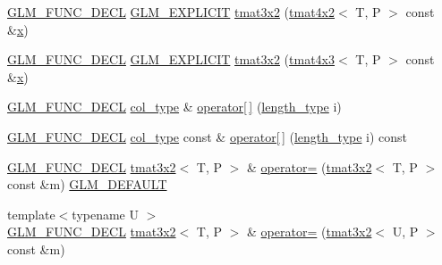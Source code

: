\begin{DoxyCompactItemize}
\item 
\mbox{\hyperlink{setup_8hpp_ab2d052de21a70539923e9bcbf6e83a51}{G\+L\+M\+\_\+\+F\+U\+N\+C\+\_\+\+D\+E\+CL}} \mbox{\hyperlink{setup_8hpp_a6c74f5a5e7b134ab69023ff9a30d4d5d}{G\+L\+M\+\_\+\+E\+X\+P\+L\+I\+C\+IT}} \mbox{\hyperlink{structglm_1_1tmat3x2_aa157cfdb7cf64c70765e4421dac9e4c1}{tmat3x2}} (\mbox{\hyperlink{structglm_1_1tmat4x2}{tmat4x2}}$<$ T, P $>$ const \&\mbox{\hyperlink{glad_8h_a92d0386e5c19fb81ea88c9f99644ab1d}{x}})
\item 
\mbox{\hyperlink{setup_8hpp_ab2d052de21a70539923e9bcbf6e83a51}{G\+L\+M\+\_\+\+F\+U\+N\+C\+\_\+\+D\+E\+CL}} \mbox{\hyperlink{setup_8hpp_a6c74f5a5e7b134ab69023ff9a30d4d5d}{G\+L\+M\+\_\+\+E\+X\+P\+L\+I\+C\+IT}} \mbox{\hyperlink{structglm_1_1tmat3x2_ac101d14687670dd6916a9e5c161efdf1}{tmat3x2}} (\mbox{\hyperlink{structglm_1_1tmat4x3}{tmat4x3}}$<$ T, P $>$ const \&\mbox{\hyperlink{glad_8h_a92d0386e5c19fb81ea88c9f99644ab1d}{x}})
\item 
\mbox{\hyperlink{setup_8hpp_ab2d052de21a70539923e9bcbf6e83a51}{G\+L\+M\+\_\+\+F\+U\+N\+C\+\_\+\+D\+E\+CL}} \mbox{\hyperlink{structglm_1_1tmat3x2_a341f5be67463bce97692bc232312b7e8}{col\+\_\+type}} \& \mbox{\hyperlink{structglm_1_1tmat3x2_a7bf6dec8837ea7b18163629c1fdf60bb}{operator\mbox{[}$\,$\mbox{]}}} (\mbox{\hyperlink{structglm_1_1tmat3x2_a358b949a615ed48c4dc18c53a55358df}{length\+\_\+type}} i)
\item 
\mbox{\hyperlink{setup_8hpp_ab2d052de21a70539923e9bcbf6e83a51}{G\+L\+M\+\_\+\+F\+U\+N\+C\+\_\+\+D\+E\+CL}} \mbox{\hyperlink{structglm_1_1tmat3x2_a341f5be67463bce97692bc232312b7e8}{col\+\_\+type}} const  \& \mbox{\hyperlink{structglm_1_1tmat3x2_a870e0f36a2588eb7e739aa52a2302279}{operator\mbox{[}$\,$\mbox{]}}} (\mbox{\hyperlink{structglm_1_1tmat3x2_a358b949a615ed48c4dc18c53a55358df}{length\+\_\+type}} i) const
\item 
\mbox{\hyperlink{setup_8hpp_ab2d052de21a70539923e9bcbf6e83a51}{G\+L\+M\+\_\+\+F\+U\+N\+C\+\_\+\+D\+E\+CL}} \mbox{\hyperlink{structglm_1_1tmat3x2}{tmat3x2}}$<$ T, P $>$ \& \mbox{\hyperlink{structglm_1_1tmat3x2_ad3e07207fa54ffc24aad6151ab116af8}{operator=}} (\mbox{\hyperlink{structglm_1_1tmat3x2}{tmat3x2}}$<$ T, P $>$ const \&m) \mbox{\hyperlink{setup_8hpp_aefce7051c376a64ba89fa93a9f63bc2c}{G\+L\+M\+\_\+\+D\+E\+F\+A\+U\+LT}}
\item 
{\footnotesize template$<$typename U $>$ }\\\mbox{\hyperlink{setup_8hpp_ab2d052de21a70539923e9bcbf6e83a51}{G\+L\+M\+\_\+\+F\+U\+N\+C\+\_\+\+D\+E\+CL}} \mbox{\hyperlink{structglm_1_1tmat3x2}{tmat3x2}}$<$ T, P $>$ \& \mbox{\hyperlink{structglm_1_1tmat3x2_a5d7234f313530abc1c77413d15fa6882}{operator=}} (\mbox{\hyperlink{structglm_1_1tmat3x2}{tmat3x2}}$<$ U, P $>$ const \&m)

\end{DoxyCompactItemize}
